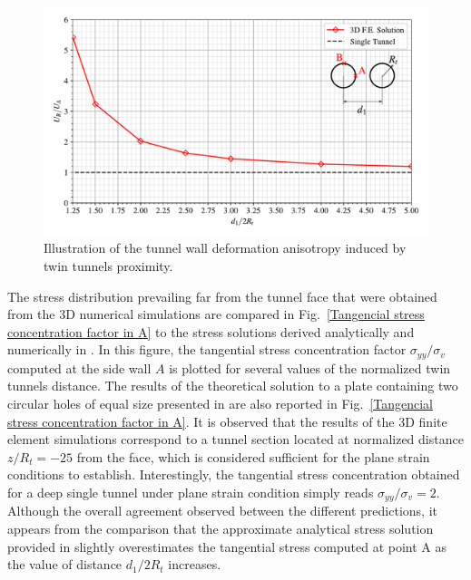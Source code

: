 \documentclass[Journal,letterpaper, NoLists,SectionNumbers]{ascelike-new}
\begin{document}
\begin{figure}[h!]
	\centering
	\includegraphics[scale=0.65]{Relationship between Convergence in B and A.pdf}
	\caption{Illustration of the tunnel wall deformation anisotropy induced by twin tunnels proximity.}
	\label{Relationship between convergence in B and A}
\end{figure}

The stress distribution prevailing far from the tunnel face that were obtained from the 3D numerical simulations are compared in Fig.~\ref{Tangencial stress concentration factor in A} to the stress solutions derived analytically and numerically in . In this figure, the tangential stress concentration factor $\sigma_{yy}/\sigma_v$ computed at the side wall $A$ is plotted for several values of the normalized twin tunnels distance. The results of the theoretical solution to a plate containing two circular holes of equal size presented in  are also reported in Fig.~\ref{Tangencial stress concentration factor in A}. It is observed that the results of the 3D finite element simulations correspond to a tunnel section located at normalized distance $z/R_t = -25$ from the face, which is considered sufficient for the plane strain conditions to establish. Interestingly, the tangential stress concentration obtained for a deep single tunnel under plane strain condition simply reads $\sigma_{yy}/\sigma_v = 2$. Although the overall agreement observed between the different predictions, it appears from the comparison that the approximate analytical stress solution provided in  slightly overestimates the tangential stress computed at point A as the value of distance $d_1/2R_t$  increases.
\end{document}
